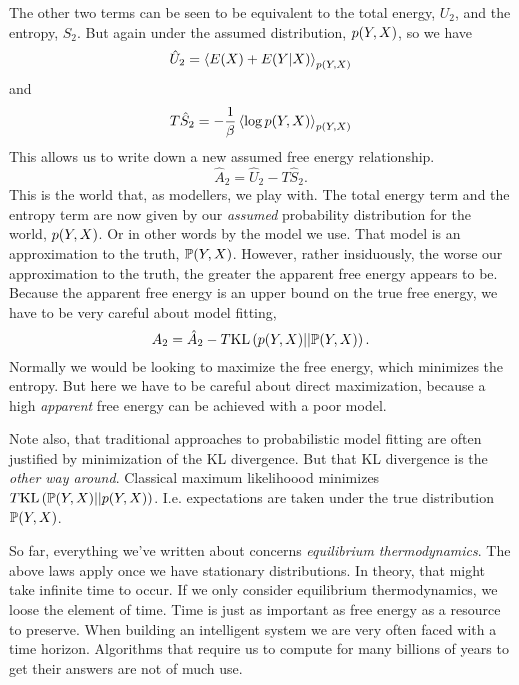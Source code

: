 \documentclass[]{article}
\begin{document}
The other two terms can be seen to be equivalent to the total energy,
\(U_2\), and the entropy, \(S_2\). But again under the assumed
distribution, \(p(Y, X)\), so we have \[
\hat{U}_2 = \left\langle E(X) +E(Y | X) \right\rangle_{p(Y, X)}
\] and \[
T\hat{S}_2 = - \frac{1}{\beta} \left\langle \log p(Y, X) \right\rangle_{p(Y, X)}
\] 
This allows us to write down a new assumed free energy relationship.
\[
\hat{A}_2 = \hat{U}_2 - T\hat{S}_2.
\] 
This is the world that, as modellers, we play with. The total energy
term and the entropy term are now given by our \emph{assumed}
probability distribution for the world,
\(p(Y, X)\). Or in other words by the model
we use. That model is an approximation to the truth,
\(\mathbb{P}(Y, X)\). However, rather
insiduously, the worse our approximation to the truth, the greater the
apparent free energy appears to be. Because the apparent free energy is
an upper bound on the true free energy, we have to be very careful about
model fitting, 
\[
A_2 = \hat{A}_2 - T \text{KL}\left(p(Y, X) || \mathbb{P}(Y, X)\right).
\] 
Normally we would be looking to maximize the free energy, which
minimizes the entropy. But here we have to be careful about direct
maximization, because a high \emph{apparent} free energy can be achieved
with a poor model.

Note also, that traditional approaches to probabilistic model fitting
are often justified by minimization of the KL divergence. But that KL
divergence is the \emph{other way around}. Classical maximum likelihoood
minimizes
\(T \text{KL}\left(\mathbb{P}(Y, X) || p(Y, X)\right)\).
I.e. expectations are taken under the true distribution
\(\mathbb{P}(Y, X)\).

So far, everything we've written about concerns \emph{equilibrium
thermodynamics}. The above laws apply once we have stationary
distributions. In theory, that might take infinite time to occur. If we
only consider equilibrium thermodynamics, we loose the element of time.
Time is just as important as free energy as a resource to preserve. When
building an intelligent system we are very often faced with a time
horizon. Algorithms that require us to compute for many billions of
years to get their answers are not of much use.
\end{document}

